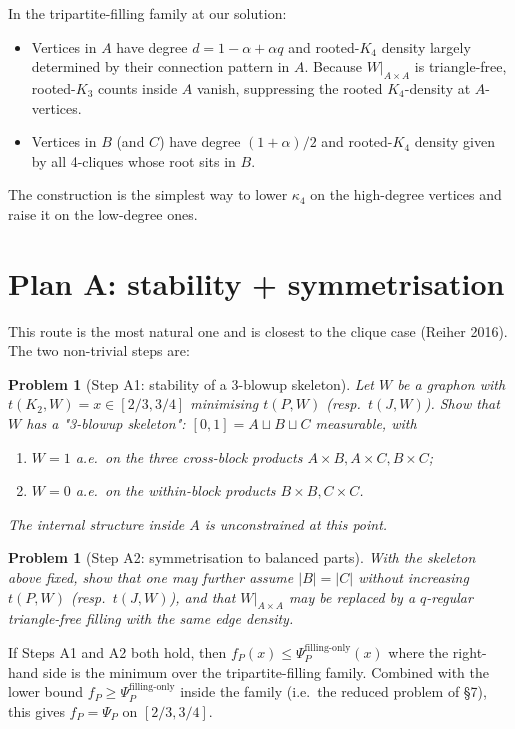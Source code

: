\documentclass[11pt]{amsart}
\newtheorem{problem}[theorem]{Problem}
\theoremstyle{definition}
\begin{document}
In the tripartite-filling family at our solution:
\begin{itemize}[itemsep=2pt]
\item Vertices in $A$ have degree $d = 1-\alpha+\alpha q$ and rooted-$K_4$
density largely determined by their connection pattern in $A$.  Because $W|_{A\times A}$
is triangle-free, rooted-$K_3$ counts inside $A$ vanish, suppressing the
rooted $K_4$-density at $A$-vertices.
\item Vertices in $B$ (and $C$) have degree $(1+\alpha)/2$ and rooted-$K_4$
density given by all 4-cliques whose root sits in $B$.
\end{itemize}
The construction is the simplest way to lower $\kappa_4$ on the high-degree
vertices and raise it on the low-degree ones.

\section{Plan A: stability + symmetrisation}

This route is the most natural one and is closest to the clique case
(Reiher 2016).  The two non-trivial steps are:

\begin{problem}[Step A1: stability of a 3-blowup skeleton]
\label{prob:A1}
Let $W$ be a graphon with $t(K_2,W)=x\in[2/3,3/4]$ minimising
$t(P,W)$ (resp.\ $t(J,W)$).  Show that $W$ has a "3-blowup skeleton":
$[0,1] = A\sqcup B\sqcup C$ measurable, with
\begin{enumerate}[label=(\arabic*),itemsep=2pt]
\item $W=1$ a.e.\ on the three cross-block products $A\times B, A\times C,
B\times C$;
\item $W=0$ a.e.\ on the within-block products $B\times B, C\times C$.
\end{enumerate}
The internal structure inside $A$ is unconstrained at this point.
\end{problem}

\begin{problem}[Step A2: symmetrisation to balanced parts]
\label{prob:A2}
With the skeleton above fixed, show that one may further assume $|B|=|C|$
without increasing $t(P,W)$ (resp.\ $t(J,W)$), and that $W|_{A\times A}$ may
be replaced by a $q$-regular triangle-free filling with the same edge density.
\end{problem}

If Steps A1 and A2 both hold, then $f_P(x) \le \Psi_P^{\text{filling-only}}(x)$
where the right-hand side is the minimum over the tripartite-filling family.
Combined with the lower bound $f_P\ge \Psi_P^{\text{filling-only}}$ inside the
family (i.e.\ the reduced problem of §7), this gives $f_P=\Psi_P$ on $[2/3,3/4]$.
\end{document}
